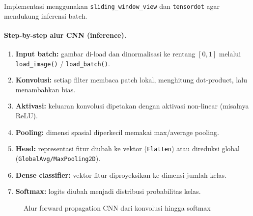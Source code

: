 Implementasi menggunakan \texttt{sliding\_window\_view} dan \texttt{tensordot} agar mendukung inferensi batch.

\paragraph{Step-by-step alur CNN (inference).}
\begin{enumerate}
    \item \textbf{Input batch:} gambar di-load dan dinormalisasi ke rentang $[0,1]$ melalui \texttt{load\_image()} / \texttt{load\_batch()}.
    \item \textbf{Konvolusi:} setiap filter membaca patch lokal, menghitung dot-product, lalu menambahkan bias.
    \item \textbf{Aktivasi:} keluaran konvolusi dipetakan dengan aktivasi non-linear (misalnya ReLU).
    \item \textbf{Pooling:} dimensi spasial diperkecil memakai max/average pooling.
    \item \textbf{Head:} representasi fitur diubah ke vektor (\texttt{Flatten}) atau direduksi global (\texttt{GlobalAvg/MaxPooling2D}).
    \item \textbf{Dense classifier:} vektor fitur diproyeksikan ke dimensi jumlah kelas.
    \item \textbf{Softmax:} logits diubah menjadi distribusi probabilitas kelas.
\end{enumerate}

\begin{figure}[H]
    \centering
    \caption{Alur forward propagation CNN dari konvolusi hingga softmax}
\end{figure}


